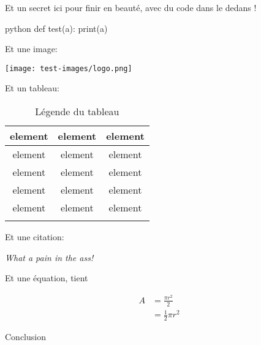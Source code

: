\documentclass[small]{zmdocumentdd}
\begin{document}
\levelOneConclusion

\begin{Spoiler}
Et un secret ici pour finir en beauté, avec du code dans le dedans !

\begin{CodeBlock}[][1]{python}
def test(a):
    print(a)
\end{CodeBlock}

Et une image:

\begin{center}
\texttt{[image: test-images/logo.png]}
\end{center}

Et un tableau:

\begin{longtabu}{|c|c|c|} \hline
element & element & element\\ \hline
element & element & element\\ \hline
element & element & element\\ \hline
element & element & element\\ \hline
element & element & element\\ \hline
\caption{Légende du tableau}
\end{longtabu}

Et une citation:

\begin{Quotation}[me]
\textit{What a pain in the ass!}
\end{Quotation}

Et une équation, tient

\[
\begin{split}
A & = \frac{\pi r^2}{2} \\
 & = \frac{1}{2} \pi r^2
\end{split}
\]

\end{Spoiler}

Conclusion

\end{document}
